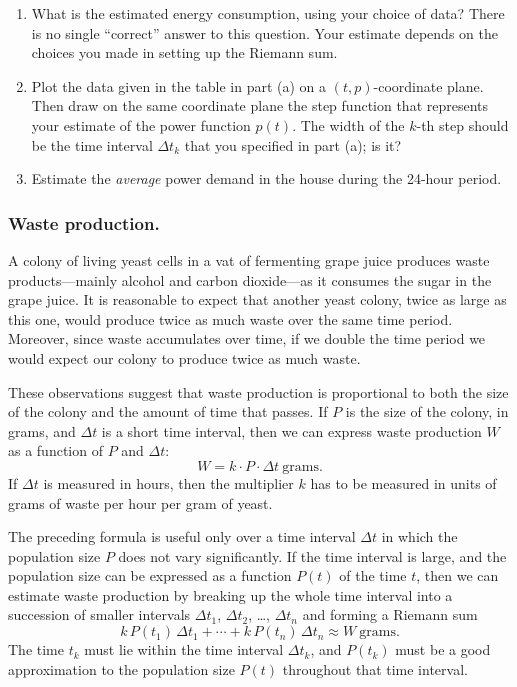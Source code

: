 \begin{enumerate}
\begin{enumerate}
  \item What is the estimated energy consumption, using your choice of data?   There is no single ``correct'' answer to this question.  Your estimate depends on the choices you made in setting up the Riemann sum.

  \item Plot the data given in the table in part (a) on a $(t, p)$-coordinate plane.  Then draw on the same coordinate plane the step function that represents your estimate of the power function $p(t)$.  The width of the $k$-th step should be the time interval $\Delta t_k$ that you specified in part (a); is it?

  \item Estimate the {\em average\/} power demand in the house during the 24-hour period.




  \end{enumerate}
\end{enumerate}
\subsubsection{Waste production.}
A colony of living yeast cells in a vat of fermenting grape juice produces waste products---mainly alcohol and carbon dioxide---as it consumes the sugar in the grape juice.  It is reasonable to expect that another yeast colony, twice as large as this one, would produce twice as much waste over the same time period.  Moreover, since waste accumulates
over time, if we double the time period we would expect our colony to produce twice as much waste.  

	These observations suggest that waste production is proportional to both the size of the colony and the amount of time that passes.  If $P$ is the size of the colony, in grams, and $\Delta t$ is a short time interval, then we can express waste production $W$ as a function of $P$ and $\Delta t$:
	\[
W = k \cdot P \cdot \Delta t \ \mbox{grams}.
\]
If $\Delta t$ is measured in hours, then the multiplier $k$ has to be measured in units of grams of waste per hour per gram of yeast.

	The preceding formula is useful only over a time interval $\Delta t$ in which the population size $P$ does not vary significantly.  If the time interval is large, and the population size can be expressed as a function $P(t)$ of the time $t$, then we can estimate waste production by breaking up the whole time interval into a succession of smaller intervals $\Delta t_1$, $\Delta t_2$, \ldots , $\Delta t_n$ and forming a Riemann sum
	\[
k\,P(t_1)\,\Delta t_1 + \cdots + 
		k\,P(t_n)\,\Delta t_n \approx W \ \mbox{grams}.
\]
The time $t_k$ must lie within the time interval $\Delta t_k$, and $P(t_k)$ must be a good approximation to the population size $P(t)$ throughout that time interval.  


